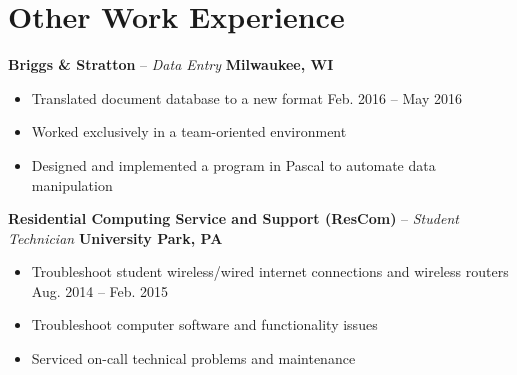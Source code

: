 \documentclass[letterpaper,10pt]{article}
\begin{document}
\section{Other Work Experience}
\textbf{Briggs \& Stratton} -- \textit{Data Entry} \hfill \textbf{Milwaukee, WI}
{\setlength{\parskip}{0pt}\begin{itemize}
\item Translated document database to a new format \hfill Feb. 2016 -- May 2016
\item Worked exclusively in a team-oriented environment
\item Designed and implemented a program in Pascal to automate data manipulation
\end{itemize}}
\textbf{Residential Computing Service and Support (ResCom)} -- \textit{Student Technician} \hfill \textbf{University Park, PA}
{\setlength{\parskip}{0pt}\begin{itemize}
\item Troubleshoot student wireless/wired internet connections and wireless routers \hfill Aug. 2014 -- Feb. 2015
\item Troubleshoot computer software and functionality issues
\item Serviced on-call technical problems and maintenance
\end{itemize}}
\end{document}
